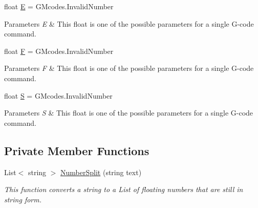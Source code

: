 \begin{DoxyCompactItemize}
float \hyperlink{class_gcode_command_ad853d24d1bd2f9a240db21073aa70485}{E} = G\+Mcodes.\+Invalid\+Number
\begin{DoxyCompactList}\small\item\em 
\begin{DoxyParams}{Parameters}
{\em E} & This float is one of the possible parameters for a single G-\/code command.\\
\hline
\end{DoxyParams}
\end{DoxyCompactList}\item 
\mbox{\label{class_gcode_command_a93dd15b57d51fa236b9ff7451fab7869}} 
float \hyperlink{class_gcode_command_a93dd15b57d51fa236b9ff7451fab7869}{F} = G\+Mcodes.\+Invalid\+Number
\begin{DoxyCompactList}\small\item\em 
\begin{DoxyParams}{Parameters}
{\em F} & This float is one of the possible parameters for a single G-\/code command.\\
\hline
\end{DoxyParams}
\end{DoxyCompactList}\item 
\mbox{\label{class_gcode_command_a3cddf7beda991f104e128f5caee224f1}} 
float \hyperlink{class_gcode_command_a3cddf7beda991f104e128f5caee224f1}{S} = G\+Mcodes.\+Invalid\+Number
\begin{DoxyCompactList}\small\item\em 
\begin{DoxyParams}{Parameters}
{\em S} & This float is one of the possible parameters for a single G-\/code command.\\
\hline
\end{DoxyParams}
\end{DoxyCompactList}\end{DoxyCompactItemize}
\subsection*{Private Member Functions}
\begin{DoxyCompactItemize}
\item 
List$<$ string $>$ \hyperlink{class_gcode_command_a39d602bf1f22666bc0dd2431b15214ed}{Number\+Split} (string text)
\begin{DoxyCompactList}\small\item\em This function converts a string to a List of floating numbers that are still in string form. \end{DoxyCompactList}\end{DoxyCompactItemize}
